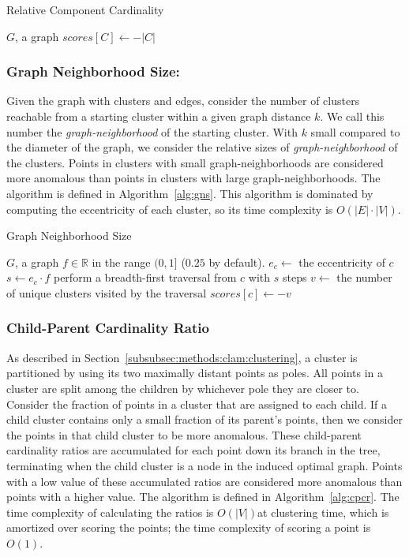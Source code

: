 \begin{algorithm}[h]
    \caption{Relative Component Cardinality}
    \label{alg:rcc}
\begin{algorithmic}[1]
    \REQUIRE $G$, a graph
        \STATE $scores[C] \gets -|C|$
    \ENDFOR
\end{algorithmic}
\end{algorithm}

\subsubsection{Graph Neighborhood Size:}
Given the graph with clusters and edges, consider the number of clusters reachable from a starting cluster within a given graph distance $k$.
We call this number the \textit{graph-neighborhood} of the starting cluster.
With $k$ small compared to the diameter of the graph, we consider the relative sizes of \textit{graph-neighborhood} of the clusters.
Points in clusters with small graph-neighborhoods are considered more anomalous than points in clusters with large graph-neighborhoods.
The algorithm is defined in Algorithm~\ref{alg:gns}.
This algorithm is dominated by computing the eccentricity of each cluster, so its time complexity is $O(|E| \cdot |V|)$.

\begin{algorithm}[h]
    \caption{Graph Neighborhood Size}
    \label{alg:gns}
\begin{algorithmic}[1]
    \REQUIRE $G$, a graph
    \REQUIRE $f \in \mathbb{R}$ in the range $(0,1]$ ($0.25$ by default).
        \STATE $e_c \gets$ the eccentricity of $c$
        \STATE $s \gets e_c \cdot f$
        \STATE perform a breadth-first traversal from $c$ with $s$ steps
        \STATE $v \gets$ the number of unique clusters visited by the traversal
        \STATE $scores[c] \gets -v$
    \ENDFOR
\end{algorithmic}
\end{algorithm}

\subsubsection{Child-Parent Cardinality Ratio}
As described in Section~\ref{subsubsec:methods:clam:clustering}, a cluster is partitioned by using its two maximally distant points as poles.
All points in a cluster are split among the children by whichever pole they are closer to.
Consider the fraction of points in a cluster that are assigned to each child.
If a child cluster contains only a small fraction of its parent's points, then we consider the points in that child cluster to be more anomalous.
These child-parent cardinality ratios are accumulated for each point down its branch in the tree, terminating when the child cluster is a node in the induced optimal graph.
Points with a low value of these accumulated ratios are considered more anomalous than points with a higher value.
The algorithm is defined in Algorithm~\ref{alg:cpcr}.
The time complexity of calculating the ratios is $O(|V|)$at clustering time, which is amortized over scoring the points; the time complexity of scoring a point is $O(1)$.

